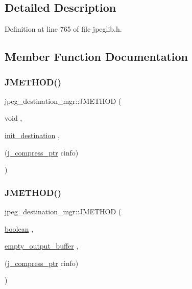 \subsection{Detailed Description}


Definition at line 765 of file jpeglib.\+h.



\subsection{Member Function Documentation}
\mbox{\label{structjpeg__destination__mgr_ae29d14eb632140c7c67eda8c5824383c}} 
\subsubsection{\texorpdfstring{JMETHOD()}{JMETHOD()}\hspace{0.1cm}{\footnotesize\ttfamily [1/3]}}
{\footnotesize\ttfamily jpeg\+\_\+destination\+\_\+mgr\+::\+J\+M\+E\+T\+H\+OD (\begin{DoxyParamCaption}\item[{void}]{,  }\item[{\mbox{\hyperlink{jdatadst_8c_abc7ed5278b728c7fd1cb2b00d5297c75}{init\+\_\+destination}}}]{,  }\item[{(\mbox{\hyperlink{jpeglib_8h_add2a072c54e3a51550f4975f7ddb91e7}{j\+\_\+compress\+\_\+ptr}} cinfo)}]{ }\end{DoxyParamCaption})}

\mbox{\label{structjpeg__destination__mgr_a7357b5d5cab543cfa243dd59f101b8f2}} 
\subsubsection{\texorpdfstring{JMETHOD()}{JMETHOD()}\hspace{0.1cm}{\footnotesize\ttfamily [2/3]}}
{\footnotesize\ttfamily jpeg\+\_\+destination\+\_\+mgr\+::\+J\+M\+E\+T\+H\+OD (\begin{DoxyParamCaption}\item[{\mbox{\hyperlink{jmorecfg_8h_a7c6368b321bd9acd0149b030bb8275ed}{boolean}}}]{,  }\item[{\mbox{\hyperlink{jdatadst_8c_ad29423c77a4142a1ec1771aa4a419a09}{empty\+\_\+output\+\_\+buffer}}}]{,  }\item[{(\mbox{\hyperlink{jpeglib_8h_add2a072c54e3a51550f4975f7ddb91e7}{j\+\_\+compress\+\_\+ptr}} cinfo)}]{ }\end{DoxyParamCaption})}

